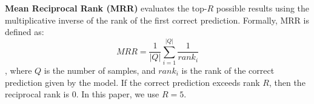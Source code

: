 \textbf{Mean Reciprocal Rank (MRR)} evaluates the top-$R$ possible results using the multiplicative inverse of the rank of the first correct prediction. 
Formally, MRR is defined as:
\begin{equation}
    \label{eq:mrr}
    MRR=\frac{1}{|Q|}\sum_{i=1}^{|Q|}\frac{1}{rank_i}
\end{equation}
\noindent, where $Q$ is the number of samples, and $rank_i$ is the rank of the correct prediction given by the model.
If the correct prediction exceeds rank $R$, then the reciprocal rank is 0.
In this paper, we use $R=5$.